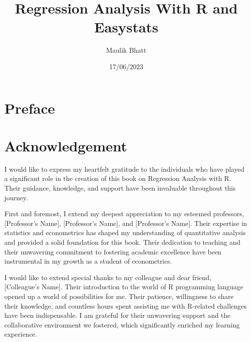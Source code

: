 \documentclass[
  letterpaper,
  twoside,
  openany]{scrbook}
\title{Regression Analysis With R and Easystats}
\author{Maulik Bhatt}
\date{17/06/2023}
\renewcommand*\contentsname{Table of contents}
\newcommand\contentsname{Table of contents}
\begin{document}
\frontmatter
\maketitle
\ifdefined\Shaded\renewenvironment{Shaded}{\begin{tcolorbox}[sharp corners, frame hidden, breakable, enhanced, interior hidden, boxrule=0pt, borderline west={3pt}{0pt}{shadecolor}]}{\end{tcolorbox}}\fi

\renewcommand*\contentsname{Contents}
{
\hypersetup{linkcolor=}
\setcounter{tocdepth}{2}
\tableofcontents
}
\listoffigures
\listoftables
\mainmatter
{}

\hypertarget{preface}{%
\chapter*{Preface}\label{preface}}



\hypertarget{acknowledgement}{%
\chapter*{Acknowledgement}\label{acknowledgement}}


I would like to express my heartfelt gratitude to the individuals who
have played a significant role in the creation of this book on
Regression Analysis with R. Their guidance, knowledge, and support have
been invaluable throughout this journey.

First and foremost, I extend my deepest appreciation to my esteemed
professors, {[}Professor's Name{]}, {[}Professor's Name{]}, and
{[}Professor's Name{]}. Their expertise in statistics and econometrics
has shaped my understanding of quantitative analysis and provided a
solid foundation for this book. Their dedication to teaching and their
unwavering commitment to fostering academic excellence have been
instrumental in my growth as a student of econometrics.

I would like to extend special thanks to my colleague and dear friend,
{[}Colleague's Name{]}. Their introduction to the world of R programming
language opened up a world of possibilities for me. Their patience,
willingness to share their knowledge, and countless hours spent
assisting me with R-related challenges have been indispensable. I am
grateful for their unwavering support and the collaborative environment
we fostered, which significantly enriched my learning experience.
\end{document}
